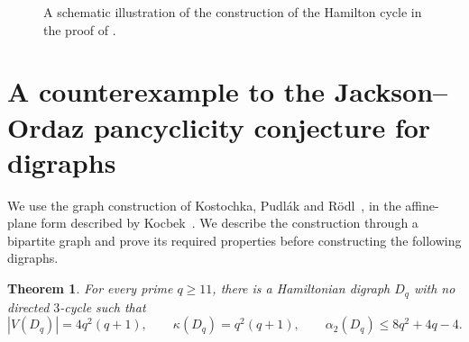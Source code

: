 \documentclass[11pt,a4paper]{article}
\newtheorem{theorem}{Theorem}[section]
\theoremstyle{remark}
\numberwithin{equation}{section}
\newcommand{\al}{\alpha_2}
\begin{document}
\begin{figure}[t]
	\endgroup
	\caption{A schematic illustration of the construction of the Hamilton
		cycle in the proof of .}
	\label{fig:whole-construction}
\end{figure}
	
	
\section{A counterexample to the Jackson--Ordaz pancyclicity conjecture
	for digraphs}\label{sec:pancyclicity}

We use the graph construction of Kostochka, Pudl\'ak and
R\"odl~\cite[Section~2]{KPR}, in the affine-plane form described by
Kocbek~\cite[Definition~2.2 and Theorem~4.2]{Kocbek}.
We describe the construction through a bipartite graph and prove
its required properties before constructing the following digraphs.

\begin{theorem}\label{thm:pancyclic-construction}
	For every prime $q\ge11$, there is a Hamiltonian digraph $D_q$
	with no directed $3$-cycle such that
	\[
	|V(D_q)|=4q^2(q+1),\qquad
	\kappa(D_q)=q^2(q+1),\qquad
	\al(D_q)\le8q^2+4q-4.
	\]
\end{theorem}
\end{document}
